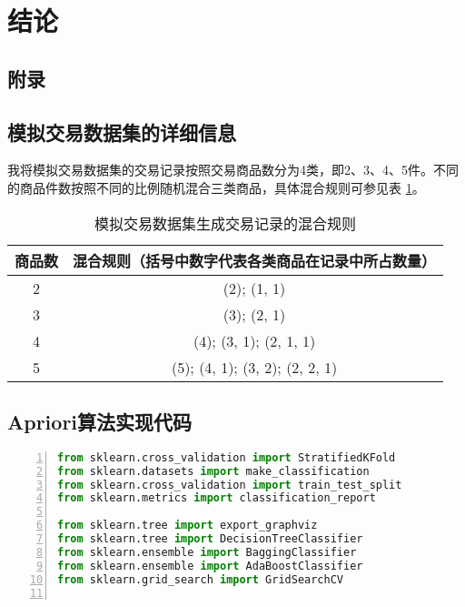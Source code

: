 \documentclass[12pt,a4paper]{article}
\theoremstyle{definition}
\begin{document}
\section{结论}


\newpage
\begin{appendix}
	\section{附录}
	\subsection{模拟交易数据集的详细信息}
	\label{apd:dataset}
	
	我将模拟交易数据集的交易记录按照交易商品数分为4类，即2、3、4、5件。不同的商品件数按照不同的比例随机混合三类商品，具体混合规则可参见表 \ref{tab:dataset}。
	
	\begin{table}[H]
		\renewcommand\arraystretch{1.35}
		\caption{模拟交易数据集生成交易记录的混合规则}
		\label{tab:dataset}
		\centering
		
		\begin{tabular}{c|c}
			\centering
			商品数 & 混合规则（括号中数字代表各类商品在记录中所占数量） \\
			\hline
			2 & (2); (1, 1) \\
			3 & (3); (2, 1) \\
			4 & (4); (3, 1); (2, 1, 1) \\
			5 & (5); (4, 1); (3, 2); (2, 2, 1) \\		
		\end{tabular}
	\end{table}
	
	
	\subsection{Apriori算法实现代码}
	\label{apd:code}
	
	\begin{lstlisting}[language=Python,
	numbers=left,
	keywordstyle=\color{blue!70},
	frame=shadowbox,
	breaklines=True]
from sklearn.cross_validation import StratifiedKFold
from sklearn.datasets import make_classification
from sklearn.cross_validation import train_test_split
from sklearn.metrics import classification_report

from sklearn.tree import export_graphviz
from sklearn.tree import DecisionTreeClassifier
from sklearn.ensemble import BaggingClassifier
from sklearn.ensemble import AdaBoostClassifier
from sklearn.grid_search import GridSearchCV


\end{lstlisting}
\end{appendix}
\end{document}
